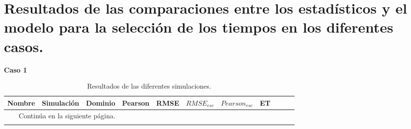 

\chapter{Resultados de las comparaciones entre los estadísticos y el modelo para la selección de los tiempos en los diferentes casos.}
\label{anexo:resultados_comparaciones_estadisticos_tiempos}
\begin{landscape}

\textbf{Caso 1}

\begin{longtable}{p{2cm}rrrrrrrrrr}
\caption{Resultados de las diferentes simulaciones.}
\label{tab:estaciones_tiempo_wrf}\\
\hline
   Nombre &  Simulación & Dominio &  Pearson &     RMSE &  $RMSE_{esc}$ &    $Pearson_{esc}$ &      ET \\
   
\midrule
\endhead
\midrule
\multicolumn{3}{r}{{Continúa en la siguiente página.}} \\
\midrule
\endfoot

\bottomrule
\endlastfoot
 

\end{longtable}
\end{landscape}
